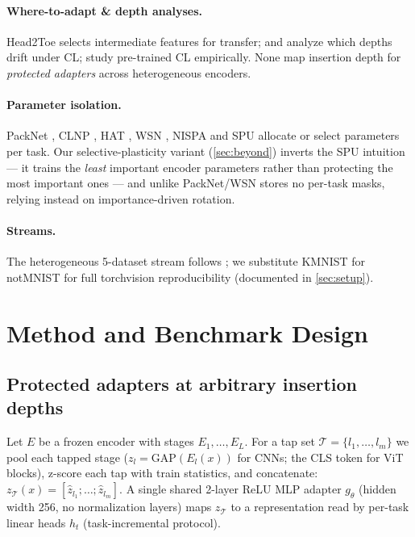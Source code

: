 \documentclass{article} %
\begin{document}
\paragraph{Where-to-adapt \& depth analyses.} Head2Toe \citep{evci2022head2toe}
selects intermediate features for transfer; \citet{ramasesh2021anatomy} and
\citet{davari2022probing} analyze which depths drift under CL;
\citet{lee2023wacv} study pre-trained CL empirically. None map insertion depth
for \emph{protected adapters} across heterogeneous encoders.

\paragraph{Parameter isolation.} PackNet \citep{mallya2018packnet}, CLNP
\citep{golkar2019clnp}, HAT \citep{serra2018hat}, WSN \citep{kang2022wsn},
NISPA \citep{gurbuz2022nispa} and SPU \citep{zhang2024spu} allocate or select
parameters per task. Our selective-plasticity variant (\cref{sec:beyond})
inverts the SPU intuition --- it trains the \emph{least} important encoder
parameters rather than protecting the most important ones --- and unlike
PackNet/WSN stores no per-task masks, relying instead on importance-driven
rotation.

\paragraph{Streams.} The heterogeneous 5-dataset stream follows
\citet{ebrahimi2020adversarial}; we substitute KMNIST for notMNIST for full
torchvision reproducibility (documented in \cref{sec:setup}).

\section{Method and Benchmark Design}
\label{sec:method}
\subsection{Protected adapters at arbitrary insertion depths}
Let $E$ be a frozen encoder with stages $E_1,\dots,E_L$. For a tap set
$\mathcal{T}=\{l_1,\dots,l_m\}$ we pool each tapped stage
($z_l=\mathrm{GAP}(E_l(x))$ for CNNs; the CLS token for ViT blocks), z-score
each tap with train statistics, and concatenate:
$z_\mathcal{T}(x)=[\hat z_{l_1};\dots;\hat z_{l_m}]$.
A single shared 2-layer ReLU MLP adapter $g_\theta$ (hidden width 256, no
normalization layers) maps $z_\mathcal{T}$ to a representation read by
per-task linear heads $h_t$ (task-incremental protocol).
\end{document}
